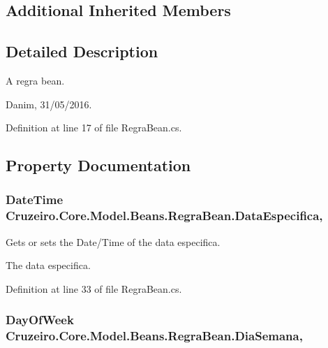 \subsection*{Additional Inherited Members}


\subsection{Detailed Description}
A regra bean. 

Danim, 31/05/2016. 

Definition at line 17 of file Regra\+Bean.\+cs.



\subsection{Property Documentation}
\subsubsection[{\texorpdfstring{Data\+Especifica}{DataEspecifica}}]{\setlength{\rightskip}{0pt plus 5cm}Date\+Time Cruzeiro.\+Core.\+Model.\+Beans.\+Regra\+Bean.\+Data\+Especifica\hspace{0.3cm}{\ttfamily [get]}, {\ttfamily [set]}}\hypertarget{class_cruzeiro_1_1_core_1_1_model_1_1_beans_1_1_regra_bean_a592374d2ee412eae712ae03477d9f38b}{}\label{class_cruzeiro_1_1_core_1_1_model_1_1_beans_1_1_regra_bean_a592374d2ee412eae712ae03477d9f38b}


Gets or sets the Date/\+Time of the data especifica. 

The data especifica. 

Definition at line 33 of file Regra\+Bean.\+cs.

\subsubsection[{\texorpdfstring{Dia\+Semana}{DiaSemana}}]{\setlength{\rightskip}{0pt plus 5cm}Day\+Of\+Week Cruzeiro.\+Core.\+Model.\+Beans.\+Regra\+Bean.\+Dia\+Semana\hspace{0.3cm}{\ttfamily [get]}, {\ttfamily [set]}}\hypertarget{class_cruzeiro_1_1_core_1_1_model_1_1_beans_1_1_regra_bean_a40097ba76b08827fb1c7b32e83aec773}{}\label{class_cruzeiro_1_1_core_1_1_model_1_1_beans_1_1_regra_bean_a40097ba76b08827fb1c7b32e83aec773}


